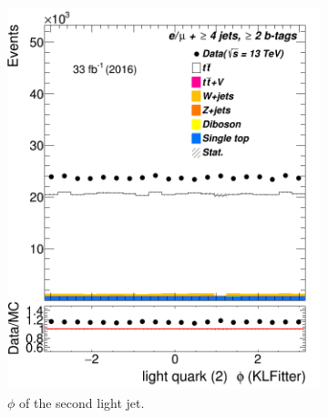\begin{figure}
	\medskip
	\begin{subfigure}{0.35\textwidth}
		\includegraphics[width=\linewidth]{ControlPlots_emujets_2016_4incl_2incl/klf_lq2_phi_emujets_2016.png}
		\caption{$\phi$ of the second light jet.} \label{fig:klf14}
	\end{subfigure}	
	\hspace*{1.5cm}	
	\begin{subfigure}{0.35\textwidth}

\end{subfigure}
\end{figure}

